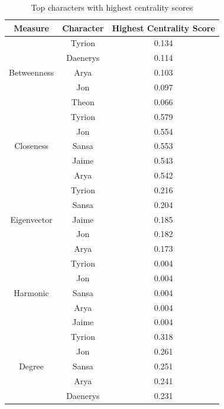 \documentclass[10pt,twocolumn,letterpaper]{article}
\begin{document}
\begin{table}[!h]
    \centering
    \small
    \begin{tabular}{c|c|c}
        Measure & Character & \small{Highest Centrality Score} \\
        \hline
                    & Tyrion & 0.134 \\
                    & Daenerys & 0.114 \\
        Betweenness & Arya & 0.103 \\
                    & Jon & 0.097 \\
                    & Theon & 0.066 \\
        \hline 
                    & Tyrion & 0.579 \\
                    & Jon & 0.554 \\
        Closeness   & Sansa & 0.553 \\
                    & Jaime & 0.543 \\
                    & Arya & 0.542 \\
        \hline 
                    & Tyrion & 0.216 \\
                    & Sansa & 0.204 \\
        Eigenvector & Jaime & 0.185 \\
                    & Jon & 0.182 \\
                    & Arya & 0.173 \\
        \hline 
                    & Tyrion & 0.004 \\
                    & Jon & 0.004 \\
        Harmonic    & Sansa & 0.004 \\
                    & Arya & 0.004 \\
                    & Jaime & 0.004 \\
        \hline
                    & Tyrion & 0.318 \\
                    & Jon & 0.261 \\
        Degree      & Sansa & 0.251 \\
                    & Arya & 0.241 \\
                    & Daenerys & 0.231 \\
        \hline
    \end{tabular}
    \vspace{0.2cm}
    \caption{Top characters with highest centrality scores}
    \label{tab:my_label}
\end{table}
\end{document}

